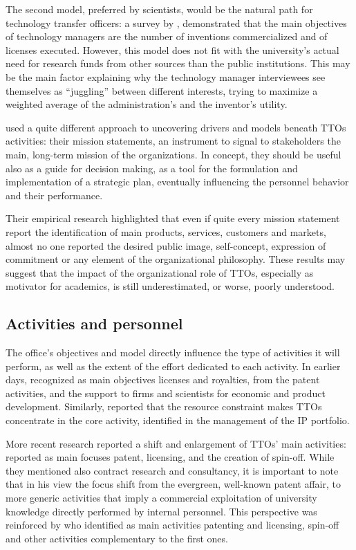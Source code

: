 The second model, preferred by scientists, would be the natural path for technology transfer officers: a survey by \citet{Jensen1998}, demonstrated that the main objectives of technology managers are the number of inventions commercialized and of licenses executed. However, this model does not fit with the university's actual need for research funds from other sources than the public institutions. This may be the main factor explaining why the technology manager interviewees see themselves as \enquote{juggling} between different interests, trying to maximize a weighted average of the administration's and the inventor's utility.

\citet{Fitzgerald2015} used a quite different approach to uncovering drivers and models beneath TTOs activities: their mission statements, an instrument to signal to stakeholders the main, long-term mission of the organizations. In concept, they should be useful also as a guide for decision making, as a tool for the formulation and implementation of a strategic plan, eventually influencing the personnel behavior and their performance.

Their empirical research highlighted that even if quite every mission statement report the identification of main products, services, customers and markets, almost no one reported the desired public image, self-concept, expression of commitment or any element of the organizational philosophy. These results may suggest that the impact of the organizational role of TTOs, especially as motivator for academics, is still underestimated, or worse, poorly understood. 

\subsection{Activities and personnel}

The office's objectives and model directly influence the type of activities it will perform, as well as the extent of the effort dedicated to each activity. In earlier days, \citet{Siegel2003a} recognized as main objectives licenses and royalties, from the patent activities, and the support to firms and scientists for economic and product development. Similarly, \citet{OwenSmith2001} reported that the resource constraint makes TTOs concentrate in the core activity, identified in the management of the IP portfolio.

More recent research reported a shift and enlargement of TTOs' main activities: \citet{Geuna2009} reported as main focuses patent, licensing, and the creation of spin-off. While they mentioned also contract research and consultancy, it is important to note that in his view the focus shift from the evergreen, well-known patent affair, to more generic activities that imply a commercial exploitation of university knowledge directly performed by internal personnel. This perspective was reinforced by \citet{Balderi2010} who identified as main activities patenting and licensing, spin-off and other activities complementary to the first ones.

